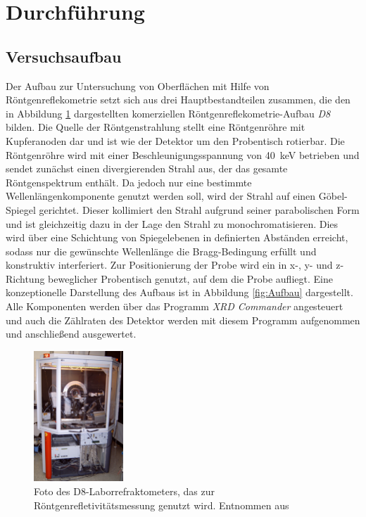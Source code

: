 \newpage
\section{Durchführung}
    \subsection{Versuchsaufbau}
        Der Aufbau zur Untersuchung von Oberflächen mit Hilfe von Röntgenreflekometrie setzt sich aus drei Hauptbestandteilen zusammen, die den in Abbildung \ref{fig:D8} dargestellten komerziellen 
        Röntgenreflekometrie-Aufbau \textit{D8} bilden. Die Quelle der Röntgenstrahlung stellt eine Röntgenröhre mit Kupferanoden dar und ist 
        wie der Detektor um den Probentisch rotierbar. Die Röntgenröhre wird mit einer Beschleunigungsspannung von \SI{40}{\kilo\electronvolt} betrieben und sendet zunächst einen divergierenden Strahl aus, 
        der das gesamte Röntgenspektrum enthält. Da jedoch nur eine bestimmte Wellenlängenkomponente genutzt werden soll, wird der Strahl auf einen Göbel-Spiegel gerichtet. Dieser kollimiert den Strahl 
        aufgrund seiner parabolischen Form und ist gleichzeitig dazu in der Lage den Strahl zu monochromatisieren. Dies wird über eine Schichtung von Spiegelebenen in definierten Abständen erreicht, sodass
        nur die gewünschte Wellenlänge die Bragg-Bedingung erfüllt und konstruktiv interferiert. Zur Positionierung der Probe wird ein in x-, y- und z-Richtung beweglicher Probentisch genutzt, auf dem die 
        Probe aufliegt. Eine konzeptionelle Darstellung des Aufbaus ist in Abbildung \ref{fig:Aufbau} dargestellt. Alle Komponenten werden über das Programm \textit{XRD Commander} angesteuert und auch die 
        Zählraten des Detektor werden mit diesem Programm aufgenommen und anschließend ausgewertet.



        \begin{figure}[h]
            \centering
            \includegraphics[width = 0.3\textwidth]{pictures/Bild_D8.png}
            \caption{Foto des D8-Laborrefraktometers, das zur Röntgenrefletivitätsmessung genutzt wird. Entnommen aus \cite{tu_dortmund_versuchsanleitung_2022}}
            \label{fig:D8}
        \end{figure}

